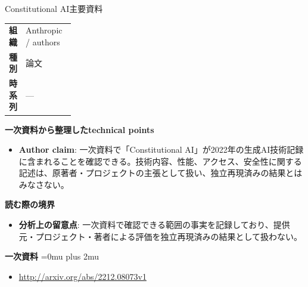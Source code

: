 \begin{technicalnote}{Constitutional AI}{主要資料}
\begingroup
\begin{tabularx}{\linewidth}{@{}>{\bfseries}p{0.22\linewidth}X@{}}
組織 & Anthropic / authors \\
種別 & 論文 \\
時系列 & — \\
\end{tabularx}
\smallskip
{\bfseries 一次資料から整理したtechnical points}
\begin{itemize}[leftmargin=1.5em,itemsep=0.35em]
\item \textbf{Author claim}: 一次資料で「Constitutional AI」が2022年の生成AI技術記録に含まれることを確認できる。技術内容、性能、アクセス、安全性に関する記述は、原著者・プロジェクトの主張として扱い、独立再現済みの結果とはみなさない。
\end{itemize}
\begin{minipage}{\linewidth}
{\bfseries 読む際の境界}
\begin{itemize}[leftmargin=1.5em,itemsep=0.35em]
\item \textbf{分析上の留意点}: 一次資料で確認できる範囲の事実を記録しており、提供元・プロジェクト・著者による評価を独立再現済みの結果として扱わない。
\end{itemize}
\begin{samepage}
{\bfseries 一次資料}
\begingroup\sloppy
\Urlmuskip=0mu plus 2mu\relax
\begin{itemize}[leftmargin=1.5em,itemsep=0.25em]
\item {\scriptsize\url{http://arxiv.org/abs/2212.08073v1}}
\end{itemize}
\endgroup
\end{samepage}
\end{minipage}
\endgroup
\end{technicalnote}
\medskip

